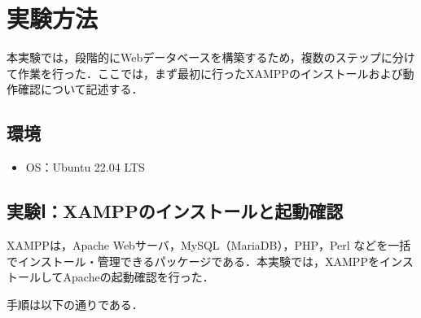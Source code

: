 \section{実験方法}

本実験では，段階的にWebデータベースを構築するため，複数のステップに分けて作業を行った．ここでは，まず最初に行ったXAMPPのインストールおよび動作確認について記述する．

\subsection*{環境}
\begin{itemize}
  \item OS：Ubuntu 22.04 LTS
\end{itemize}

\subsection*{実験Ⅰ：XAMPPのインストールと起動確認}

XAMPPは，Apache Webサーバ，MySQL（MariaDB），PHP，Perl などを一括でインストール・管理できるパッケージである．本実験では，XAMPPをインストールしてApacheの起動確認を行った．

\vspace{1zh}
\noindent 手順は以下の通りである．

